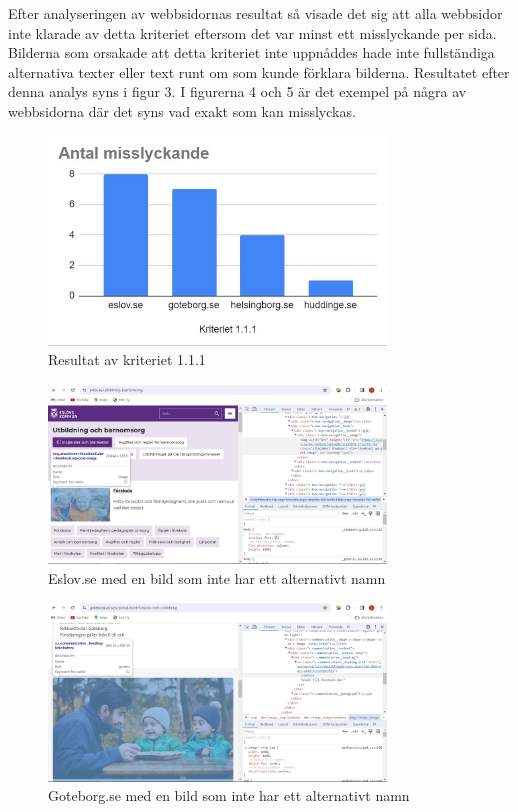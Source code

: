 \documentclass[11p]{article}
\begin{document}
    Efter analyseringen av webbsidornas resultat så visade det sig att alla webbsidor inte klarade av detta kriteriet eftersom det var minst ett misslyckande per sida.
    Bilderna som orsakade att detta kriteriet inte uppnåddes hade inte fullständiga alternativa texter eller text runt om som kunde förklara bilderna.
    Resultatet efter denna analys syns i figur 3.
    I figurerna 4 och 5 är det exempel på några av webbsidorna där det syns vad exakt som kan misslyckas.

    \begin{figure}[hbt!]
        \includegraphics[width=0.8\textwidth]{../images/resultat111.jpg}
        \caption{ Resultat av kriteriet 1.1.1 }
    \end{figure}

    \begin{figure}[hbt!]
        \includegraphics[width=0.8\textwidth]{../images/Eslov111.jpg}
        \caption{ Eslov.se med en bild som inte har ett alternativt namn }
    \end{figure}

    \begin{figure}[hbt!]
        \includegraphics[width=0.8\textwidth]{../images/Goteborg111.jpg}
        \caption{ Goteborg.se med en bild som inte har ett alternativt namn }
    \end{figure}
\end{document}
